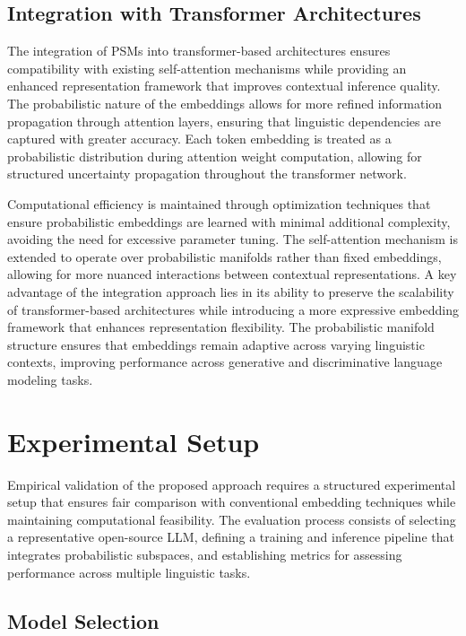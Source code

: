 \documentclass{article}
\begin{document}
\subsection{Integration with Transformer Architectures}

The integration of PSMs into transformer-based architectures ensures compatibility with existing self-attention mechanisms while providing an enhanced representation framework that improves contextual inference quality. The probabilistic nature of the embeddings allows for more refined information propagation through attention layers, ensuring that linguistic dependencies are captured with greater accuracy. Each token embedding is treated as a probabilistic distribution during attention weight computation, allowing for structured uncertainty propagation throughout the transformer network.

Computational efficiency is maintained through optimization techniques that ensure probabilistic embeddings are learned with minimal additional complexity, avoiding the need for excessive parameter tuning. The self-attention mechanism is extended to operate over probabilistic manifolds rather than fixed embeddings, allowing for more nuanced interactions between contextual representations. A key advantage of the integration approach lies in its ability to preserve the scalability of transformer-based architectures while introducing a more expressive embedding framework that enhances representation flexibility. The probabilistic manifold structure ensures that embeddings remain adaptive across varying linguistic contexts, improving performance across generative and discriminative language modeling tasks.

\section{Experimental Setup}

Empirical validation of the proposed approach requires a structured experimental setup that ensures fair comparison with conventional embedding techniques while maintaining computational feasibility. The evaluation process consists of selecting a representative open-source LLM, defining a training and inference pipeline that integrates probabilistic subspaces, and establishing metrics for assessing performance across multiple linguistic tasks.

\subsection{Model Selection}
\end{document}
